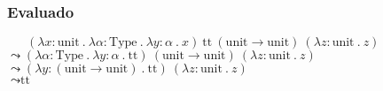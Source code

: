 \documentclass[a4paper]{article}
\newcommand{\Type}{\text{Type}}
\newcommand{\TT}{\text{tt}}
\newcommand{\Unit}{\text{unit}}
\begin{document}
\subsubsection{Evaluado}

\noindent
$\phantom{\leadsto}\
 (\lambda x : \Unit\ .\
  \lambda \alpha : \Type\ .\
  \lambda y : \alpha\ .\
  x)\
 \TT\ (\Unit \rightarrow \Unit)\
 (\lambda z : \Unit\ .\ z)$ \\
$\leadsto
 (\lambda \alpha : \Type\ .\
  \lambda y : \alpha\ .\
  \TT)\
 (\Unit \rightarrow \Unit)\
 (\lambda z : \Unit\ .\ z)$ \\
$\leadsto
 (\lambda y : (\Unit \rightarrow \Unit)\ .\
  \TT)\
 (\lambda z : \Unit\ .\ z)$ \\
$\leadsto
 \TT$
\end{document}
